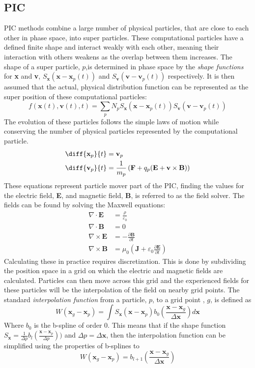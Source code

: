 \subsection{PIC}
\label{subsec:plasma pic}
PIC methods combine a large number of physical particles, that are close to each other in phase space, into super particles. These computational particles have a defined finite shape and interact weakly with each other, meaning their interaction with others weakens as the overlap between them increases. The shape of a super particle, $p$,is determined in phase space by the \textit{shape functions} for \textbf{x} and \textbf{v}, $S_{\textbf{x}}(\textbf{x}-\textbf{x}_p(t))$ and $S_{\textbf{v}}(\textbf{v}-\textbf{v}_p(t))$ respectively. It is then assumed that the actual, physical distribution function can be represented as the super position of these computational particles:
\[f(\textbf{x}(t),\textbf{v}(t),t) = \sum_{p}N_pS_{\textbf{x}}(\textbf{x}-\textbf{x}_p(t))S_{\textbf{v}}(\textbf{v}-\textbf{v}_p(t))\]
The evolution of these particles follows the simple laws of motion while conserving the number of physical particles represented by the computational particle.
\begin{align}
	\diff{{\textbf{x}_p}}{t} &= \textbf{v}_p \\
	\diff{{\textbf{v}_p}}{t} &= \frac{1}{m_p}\left(\textbf{F} + q_p(\textbf{E} + \textbf{v}\times \textbf{B})\right)
\end{align}
These equations represent particle mover part of the PIC, finding the values for the electric field, \textbf{E}, and magnetic field, \textbf{B}, is referred to as the field solver. The fields can be found by solving the Maxwell equations:
\begin{align}
	\nabla \cdot \mathbf{E} &= \frac{\rho}{\varepsilon_0} \\
	\nabla \cdot \mathbf{B} &= 0 \\
	\nabla \times \mathbf{E} &= -\frac{\partial \mathbf{B}}{\partial t} \\
	\nabla \times \mathbf{B} &= \mu_0 (\mathbf{J} + \varepsilon_0 \frac{\partial \mathbf{E}}{\partial t})
\end{align}
Calculating these in practice requires discretization. This is done by subdividing the position space in a grid on which the electric and magnetic fields are calculated. Particles can then move across this grid and the experienced fields for these particles will be the interpolation of the field on nearby grid points. The standard \textit{interpolation function} from a particle, $p$, to a grid point , $g$, is defined as \[W(\textbf{x}_g - \textbf{x}_p) = \int S_{\textbf{x}}(\textbf{x}-\textbf{x}_p)b_0\left(\frac{\textbf{x}-\textbf{x}_g}{\Delta\textbf{x}}\right) d\textbf{x}\] 
Where $b_0$ is the b-spline of order 0. This means that if the shape function $S_\textbf{x} = \frac{1}{\Delta p}b_l\left(\frac{\textbf{x}-\textbf{x}_p}{\Delta p}\right))$ and $\Delta p = \Delta \textbf{x}$, then the interpolation function can be simplified using the properties of b-splines to 
\[W(\textbf{x}_g - \textbf{x}_p) =b_{l+1}\left(\frac{\textbf{x}-\textbf{x}_g}{\Delta \textbf{x}}\right)\]

